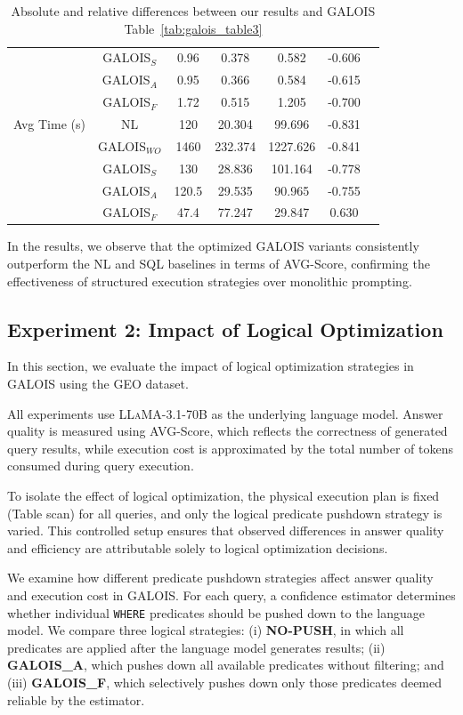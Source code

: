 \documentclass[11pt]{article}
\begin{document}
\begin{table}[htbp]
\begin{tabular}{lcccccc}
             & GALOIS$_S$    & 0.96  & 0.378   & 0.582   & -0.606 \\
             & GALOIS$_A$    & 0.95  & 0.366   & 0.584   & -0.615 \\
             & GALOIS$_F$    & 1.72  & 0.515   & 1.205   & -0.700 \\
\hline
Avg Time (s) & NL            & 120   & 20.304  & 99.696  & -0.831 \\
             & GALOIS$_{WO}$ & 1460  & 232.374 & 1227.626& -0.841 \\
             & GALOIS$_S$    & 130   & 28.836  & 101.164 & -0.778 \\
             & GALOIS$_A$    & 120.5 & 29.535  & 90.965  & -0.755 \\
             & GALOIS$_F$    & 47.4  & 77.247  & 29.847  & 0.630 \\
\hline
\end{tabular}
\caption{Absolute and relative differences between our results and GALOIS 
Table~\ref{tab:galois_table3}}
\end{table}


In the results, we observe that the optimized GALOIS variants consistently outperform the NL and SQL baselines in terms of AVG-Score, confirming the effectiveness of structured execution strategies over monolithic prompting.

\subsection{Experiment 2: Impact of Logical Optimization}
In this section, we evaluate the impact of logical optimization strategies in \textsc{GALOIS} using the \textsc{GEO} dataset.

All experiments use \textsc{LLaMA-3.1-70B} as the underlying language model.
Answer quality is measured using AVG-Score, which reflects the correctness of generated query results, while execution cost is approximated by the total number of tokens consumed during query execution.

To isolate the effect of logical optimization, the physical execution plan is fixed (Table scan) for all queries, and only the logical predicate pushdown strategy is varied.
This controlled setup ensures that observed differences in answer quality and efficiency are attributable solely to logical optimization decisions.

We examine how different predicate pushdown strategies affect answer quality and execution cost in \textsc{GALOIS}.
For each query, a confidence estimator determines whether individual \texttt{WHERE} predicates should be pushed down to the language model.
We compare three logical strategies:
(i) \textbf{NO-PUSH}, in which all predicates are applied after the language model generates results;
(ii) \textbf{GALOIS\_A}, which pushes down all available predicates without filtering; and
(iii) \textbf{GALOIS\_F}, which selectively pushes down only those predicates deemed reliable by the estimator.
\end{document}
